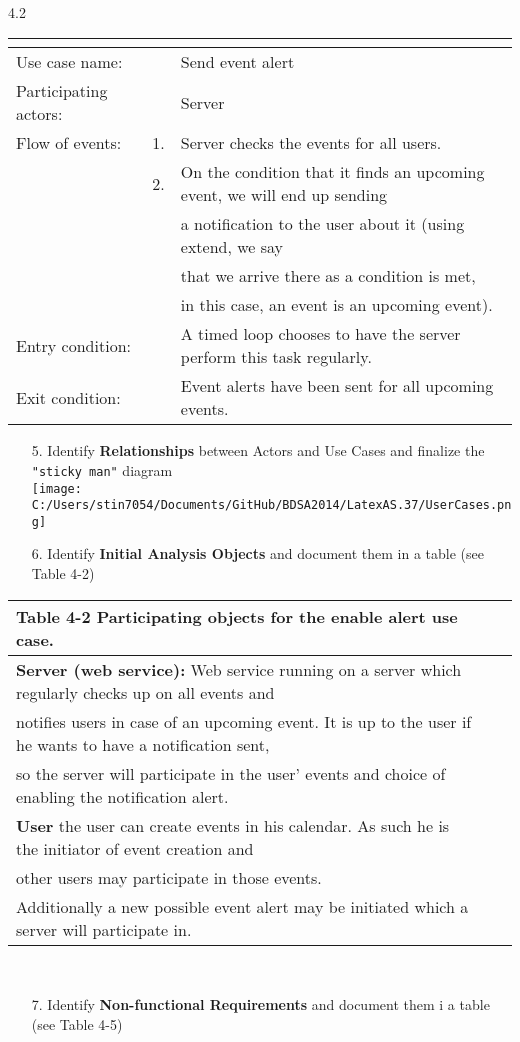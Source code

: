 \documentclass{article}
\begin{document}
	\\
	4.2\\
\begin{tabular}{l r @{} l}
	\multicolumn{2}{c}{} \\
	\hline
	Use case name:	&&Send event alert\\
	\hline
	Participating actors:&&Server\\
	\hline
	Flow of events:	&1.&Server checks the events for all users.\\
				&2.&On the condition that it finds an upcoming event, we will end up sending\\
					&&a notification to the user about it (using \flqq extend\frqq, we say\\
					&&that we arrive there as a condition is met,\\
					&&in this case, an event is an upcoming event).\\
	\hline
	Entry condition:	&&A timed loop chooses to have the server perform this task regularly.\\
	\hline
	Exit condition:	&&Event alerts have been sent for all upcoming events.\\
	\hline
\end{tabular}

	\pagebreak{}

\begin{enumerate}
		\item[5.] Identify \textbf{Relationships} between Actors and Use Cases and finalize the \verb= "sticky man"=  diagram\\
		\texttt{[image: C:/Users/stin7054/Documents/GitHub/BDSA2014/LatexAS.37/UserCases.png]}\\
		\pagebreak{}
		\item[6.] Identify \textbf{Initial Analysis Objects} and document them in a table (see Table 4-2)\\
\end{enumerate}

\begin{tabular}{l r @{} l}
	\textbf{Table 4-2} Participating objects for the enable alert use case.\\
	\hline
	\textbf{Server (web service):} Web service running on a server which regularly checks up on all events and \\
	notifies users in case of an upcoming event. It is up to the user if he wants to have a notification sent,\\ 
	so the server will participate in the user’ events and choice of enabling the notification alert.\\
	\hline
	\textbf{User} the user can create events in his calendar. As such he is the initiator of event creation and \\
	other users may participate in those events. \\
	Additionally a new possible event alert may be initiated which a server will participate in.\\
	\hline
\end{tabular}
	\\

\begin{enumerate}
		\item[7.] Identify \textbf{Non-functional Requirements} and document them i a table (see Table 4-5)\\
\end{enumerate}
\end{document}
